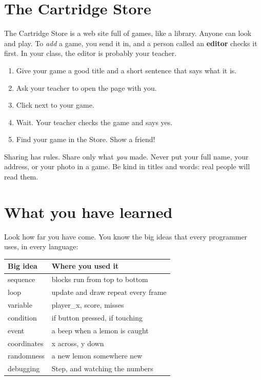 \section{The Cartridge Store}

The Cartridge Store is a web site full of \prg games, like a library. Anyone
can look and play. To \emph{add} a game, you send it in, and a person called an
\textbf{editor} checks it first. In your class, the editor is probably your
teacher.

\begin{prgmission}
\begin{enumerate}
  \item Give your game a good title and a short sentence that says what it is.
  \item Ask your teacher to open the  page with you.
  \item Click  next to your game.
  \item Wait. Your teacher checks the game and says yes.
  \item Find your game in the Store. Show a friend!
\end{enumerate}
\end{prgmission}

\begin{prgconcept}
Sharing has rules. Share only what \emph{you} made. Never put your full name,
your address, or your photo in a game. Be kind in titles and words: real people
will read them.
\end{prgconcept}

\section{What you have learned}

Look how far you have come. You know the big ideas that every programmer
uses, in every language:

\begin{center}
\begin{tabularx}{\linewidth}{@{}lX@{}}
\toprule
Big idea & Where you used it \\
\midrule
sequence & blocks run from top to bottom \\
loop & update and draw repeat every frame \\
variable & player\_x, score, misses \\
condition & if button pressed, if touching \\
event & a beep when a lemon is caught \\
coordinates & x across, y down \\
randomness & a new lemon somewhere new \\
debugging & Step, and watching the numbers \\
\bottomrule
\end{tabularx}
\end{center}

